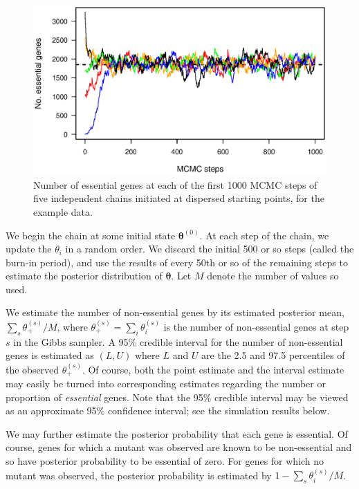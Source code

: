 \documentclass[letterpaper]{article}
\begin{document}
\begin{multicols}{2}
\begin{figure}[tbh]
\begin{center}
\includegraphics[scale=0.8]{Figs/fig3.ps}
\caption{Number of essential genes at each of the first 1000 MCMC
steps of five independent chains initiated at dispersed starting
points, for the example data.}
\end{center}
\end{figure}

We begin the chain at some initial state $\boldsymbol{\theta}^{(0)}$.
At each step of
the chain, we update the $\theta_i$ in a random order.  We discard the
initial 500 or so steps (called the burn-in period), and use the
results of every 50th or so of the remaining steps to estimate the 
posterior distribution of $\boldsymbol{\theta}$.  Let $M$ denote the
number of values so used.  

We estimate the number of non-essential genes by its estimated
posterior mean, $\sum_s \theta_+^{(s)} / M$, where $\theta_+^{(s)} =
\sum_i \theta_i^{(s)}$ is the number of non-essential genes at step
$s$ in the Gibbs sampler.  A 95\% credible interval for the number of
non-essential genes is estimated as $(L, U)$ where $L$ and $U$ are the
2.5 and 97.5 percentiles of the observed $\theta^{(s)}_+$.  Of course,
both the point estimate and the interval estimate may easily be turned
into corresponding estimates regarding the number or proportion of
\emph{essential\/} genes.  Note that the 95\% credible interval may be
viewed as an approximate 95\% confidence interval; see the simulation
results below.

We may further estimate the posterior probability that each gene is
essential.  Of course, genes for which a mutant was observed are known
to be non-essential and so have posterior probability to be
essential of zero.  For genes for which no mutant was observed, the posterior
probability is estimated by $1 - \sum_s \theta^{(s)}_i / M$.  


\end{multicols}
\end{document}
